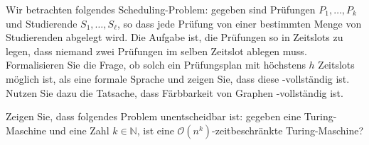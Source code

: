 \documentclass[german]{latteachCD}[2017/03/28]
\begin{document}
\begin{exercise}
  Wir betrachten folgendes Scheduling-Problem: gegeben sind Prüfungen $P_{1},
  \ldots, P_{k}$ und Studierende $S_{1}, \dots, S_{\ell}$, so dass jede Prüfung
  von einer bestimmten Menge von Studierenden abgelegt wird.  Die Aufgabe ist,
  die Prüfungen so in Zeitslots zu legen, dass niemand zwei Prüfungen im selben
  Zeitslot ablegen muss.  Formalisieren Sie die Frage, ob solch ein Prüfungsplan
  mit höchstens $h$ Zeitslots möglich ist, als eine formale Sprache und zeigen
  Sie, dass diese \NP-vollständig ist.  Nutzen Sie dazu die Tatsache, dass
  Färbbarkeit von Graphen \NP-vollständig ist.
\end{exercise}

\begin{exercise}
  Zeigen Sie, dass folgendes Problem unentscheidbar ist: gegeben eine
  Turing-Maschine  und eine Zahl $k \in \mathbb N$, ist  eine
  $\mathcal{O}(n^{k})$-zeitbeschränkte Turing-Maschine?
\end{exercise}

\end{document}

